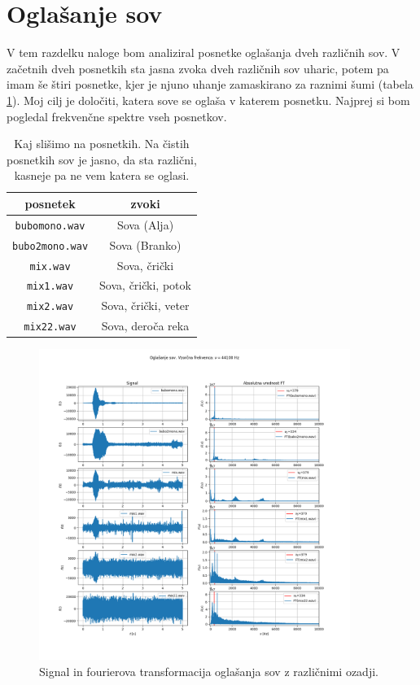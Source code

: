 \documentclass[a4paper, 12pt, slovene]{article}
\begin{document}
\section{Oglašanje sov}
V tem razdelku naloge bom analiziral posnetke oglašanja dveh različnih sov. V začetnih dveh posnetkih sta jasna zvoka dveh različnih sov uharic, potem pa imam še štiri posnetke, kjer je njuno uhanje zamaskirano za raznimi šumi (tabela \ref{t:zvoki}). Moj cilj je določiti, katera sove se oglaša v katerem posnetku. Najprej si bom pogledal frekvenčne spektre vseh posnetkov. \par\vspace{5mm}

\begin{table}[H]
\centering
\begin{tabular}{|c|c|}
\hline
posnetek & zvoki \\
\hline
\texttt{bubomono.wav}	&	Sova (Alja)	\\
\texttt{bubo2mono.wav}	&	Sova (Branko)	\\
\texttt{mix.wav}	&	Sova, črički	\\
\texttt{mix1.wav}	&	Sova, črički, potok	\\
\texttt{mix2.wav}	&	Sova, črički, veter	\\
\texttt{mix22.wav}	&	Sova, deroča reka	\\
\hline
\end{tabular}
\caption{Kaj slišimo na posnetkih. Na čistih posnetkih sov je jasno, da sta različni, kasneje pa ne vem katera se oglasi.}
\label{t:zvoki}
\end{table}

\begin{figure}[H]
\centering
\includegraphics[width=0.90\textwidth]{grafi/sove.png}
\caption{Signal in fourierova transformacija oglašanja sov z različnimi ozadji.}
\label{f:sove}
\end{figure}
\end{document}

